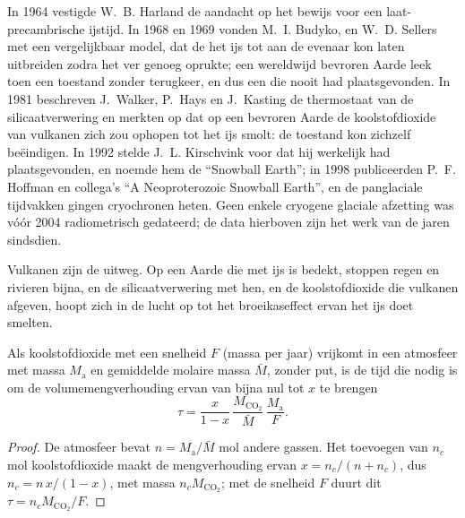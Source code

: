 \begin{history}
In 1964 vestigde W.~B. Harland de aandacht op het bewijs voor een laat-precambrische ijstijd. In
1968 en 1969 vonden M.~I. Budyko, en W.~D. Sellers met een vergelijkbaar model, dat de
 het ijs tot aan de evenaar kon laten uitbreiden zodra het ver genoeg oprukte; een
wereldwijd bevroren Aarde leek toen een toestand zonder terugkeer, en dus een die nooit had plaatsgevonden.
In 1981 beschreven J.~Walker, P.~Hays en J.~Kasting de thermostaat van de silicaatverwering en
merkten op dat op een bevroren Aarde de koolstofdioxide van vulkanen zich zou ophopen tot het ijs
smolt: de toestand kon zichzelf beëindigen. In 1992 stelde J.~L. Kirschvink voor dat hij werkelijk had
plaatsgevonden, en noemde hem de ``Snowball Earth''; in 1998 publiceerden P.~F. Hoffman en collega's
``A Neoproterozoic Snowball Earth'', en de panglaciale tijdvakken gingen cryochronen heten. Geen
enkele cryogene glaciale afzetting was vóór 2004 radiometrisch gedateerd; de data hierboven zijn het
werk van de jaren sindsdien.
\end{history}

Vulkanen zijn de uitweg. Op een Aarde die met ijs is bedekt, stoppen regen en rivieren bijna, en de
silicaatverwering met hen, en de koolstofdioxide die vulkanen afgeven, hoopt zich in de lucht op
tot het broeikaseffect ervan het ijs doet smelten.

\begin{proposition}\label{prop:b2:precambrian-earth:co2}
Als koolstofdioxide met een snelheid $F$ (massa per jaar) vrijkomt in een atmosfeer met massa
$M_{\text{a}}$ en gemiddelde molaire massa $\bar M$, zonder put, is de tijd die nodig is om de
volumemengverhouding ervan van bijna nul tot $x$ te brengen
\[
  \tau = \frac{x}{1 - x}\,\frac{M_{\mathrm{CO_2}}}{\bar M}\,\frac{M_{\text{a}}}{F} .
\]
\end{proposition}

\begin{proof}
De atmosfeer bevat $n = M_{\text{a}}/\bar M$ mol andere gassen. Het toevoegen van $n_c$ mol
koolstofdioxide maakt de mengverhouding ervan $x = n_c/(n + n_c)$, dus $n_c = n\,x/(1 - x)$, met massa
$n_c M_{\mathrm{CO_2}}$; met de snelheid $F$ duurt dit $\tau = n_c M_{\mathrm{CO_2}}/F$.
\end{proof}


